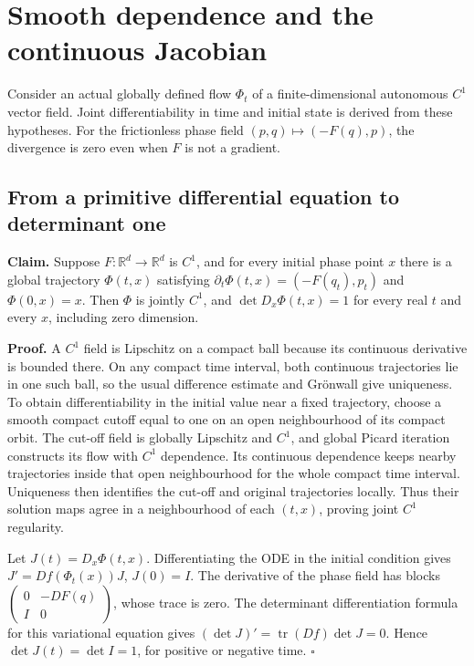 \documentclass[11pt,a4paper]{report}
\begin{document}
\section{\texorpdfstring{Smooth dependence and the continuous Jacobian}{Smooth dependence and the continuous Jacobian}}


Consider an actual globally defined flow \(\Phi_t\) of a finite-dimensional autonomous \(C^1\) vector field. Joint differentiability in time and initial state is derived from these hypotheses. For the frictionless phase field \((p,q)\mapsto(-F(q),p)\), the divergence is zero even when \(F\) is not a gradient.

\subsection{\texorpdfstring{From a primitive differential equation to determinant one}{From a primitive differential equation to determinant one}}


\textbf{Claim.} Suppose \(F:\mathbb R^d\to\mathbb R^d\) is \(C^1\), and for every initial phase point \(x\) there is a global trajectory \(\Phi(t,x)\) satisfying \(\partial_t\Phi(t,x)=(-F(q_t),p_t)\) and \(\Phi(0,x)=x\). Then \(\Phi\) is jointly \(C^1\), and \(\det D_x\Phi(t,x)=1\) for every real \(t\) and every \(x\), including zero dimension.



\textbf{Proof.} A \(C^1\) field is Lipschitz on a compact ball because its continuous derivative is bounded there. On any compact time interval, both continuous trajectories lie in one such ball, so the usual difference estimate and Grönwall give uniqueness. To obtain differentiability in the initial value near a fixed trajectory, choose a smooth compact cutoff equal to one on an open neighbourhood of its compact orbit. The cut-off field is globally Lipschitz and \(C^1\), and global Picard iteration constructs its flow with \(C^1\) dependence. Its continuous dependence keeps nearby trajectories inside that open neighbourhood for the whole compact time interval. Uniqueness then identifies the cut-off and original trajectories locally. Thus their solution maps agree in a neighbourhood of each \((t,x)\), proving joint \(C^1\) regularity.



Let \(J(t)=D_x\Phi(t,x)\). Differentiating the ODE in the initial condition gives \(J'=Df(\Phi_t(x))J\), \(J(0)=I\). The derivative of the phase field has blocks \(\begin{pmatrix}0&-DF(q)\\I&0\end{pmatrix}\), whose trace is zero. The determinant differentiation formula for this variational equation gives \((\det J)'=\operatorname{tr}(Df)\det J=0\). Hence \(\det J(t)=\det I=1\), for positive or negative time. \(\square\)
\end{document}
